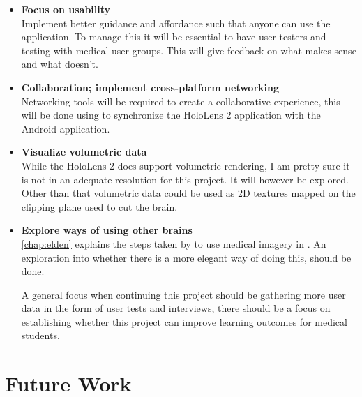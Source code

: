 \begin{itemize}

    \item {
        \textbf{Focus on usability}\\
        Implement better guidance and affordance such that anyone can use the application. To manage this it will be essential to have user testers and testing with medical user groups. This will give feedback on what makes sense and what doesn't.
        
    }
    \item {
        \textbf{Collaboration; implement cross-platform networking}\\
        Networking tools will be required to create a collaborative experience, this will be done using  to synchronize the HoloLens 2 application with the Android application.
    }

    \item {
        \textbf{Visualize volumetric data}\\
        While the HoloLens 2 does support volumetric rendering, I am pretty sure it is not in an adequate resolution for this project. It will however be explored. Other than that volumetric data could be used as 2D textures mapped on the clipping plane used to cut the brain.
    }

    \item {
        \textbf{Explore ways of using other brains}\\
        \autoref{chap:elden} explains the steps taken by \citet{Elden2017} to use medical imagery in . An exploration into whether there is a more elegant way of doing this, should be done.
    }

A general focus when continuing this project should be gathering more user data in the form of user tests and interviews, there should be a focus on establishing whether this project can improve learning outcomes for medical students.


\end{itemize}

\section{Future Work}















